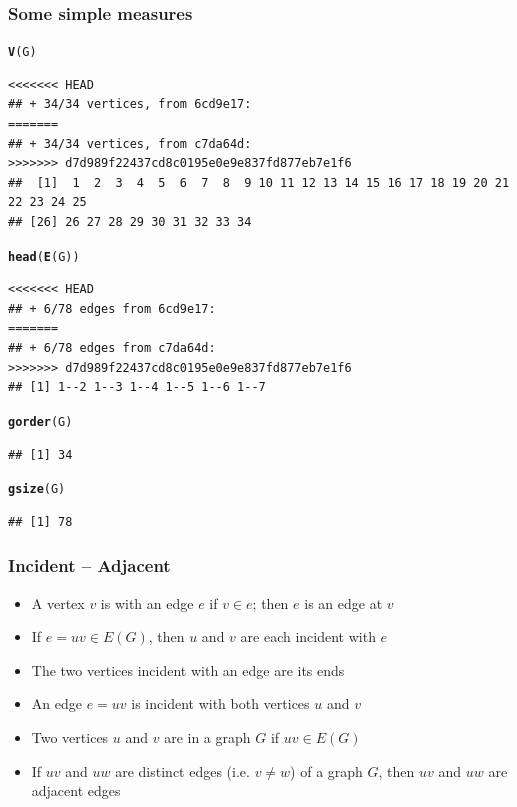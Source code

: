 \documentclass[aspectratio=169]{beamer}\usepackage[]{graphicx}\usepackage[]{xcolor}
\makeatletter
\newcommand{\hldef}[1]{\textcolor[rgb]{0.345,0.345,0.345}{#1}}%
\newcommand{\hlkwd}[1]{\textcolor[rgb]{0.737,0.353,0.396}{\textbf{#1}}}%
\newenvironment{kframe}{%
 \def\at@end@of@kframe{}%
 \ifinner\ifhmode%
  \def\at@end@of@kframe{\end{minipage}}%
  \begin{minipage}{\columnwidth}%
 \fi\fi%
 \def\FrameCommand##1{\hskip\@totalleftmargin \hskip-\fboxsep
 \colorbox{shadecolor}{##1}\hskip-\fboxsep
     \hskip-\linewidth \hskip-\@totalleftmargin \hskip\columnwidth}%
 \MakeFramed {\advance\hsize-\width
   \@totalleftmargin\z@ \linewidth\hsize
   \@setminipage}}%
 {\par\unskip\endMakeFramed%
 \at@end@of@kframe}
\newenvironment{knitrout}{}{} %
\makeatother
\begin{document}
\begin{frame}[fragile]\frametitle{Some simple measures}
\begin{knitrout}
\color{fgcolor}\begin{kframe}
\begin{alltt}
\hlkwd{V}\hldef{(G)}
\end{alltt}
\begin{verbatim}
<<<<<<< HEAD
## + 34/34 vertices, from 6cd9e17:
=======
## + 34/34 vertices, from c7da64d:
>>>>>>> d7d989f22437cd8c0195e0e9e837fd877eb7e1f6
##  [1]  1  2  3  4  5  6  7  8  9 10 11 12 13 14 15 16 17 18 19 20 21 22 23 24 25
## [26] 26 27 28 29 30 31 32 33 34
\end{verbatim}
\begin{alltt}
\hlkwd{head}\hldef{(}\hlkwd{E}\hldef{(G))}
\end{alltt}
\begin{verbatim}
<<<<<<< HEAD
## + 6/78 edges from 6cd9e17:
=======
## + 6/78 edges from c7da64d:
>>>>>>> d7d989f22437cd8c0195e0e9e837fd877eb7e1f6
## [1] 1--2 1--3 1--4 1--5 1--6 1--7
\end{verbatim}
\begin{alltt}
\hlkwd{gorder}\hldef{(G)}
\end{alltt}
\begin{verbatim}
## [1] 34
\end{verbatim}
\begin{alltt}
\hlkwd{gsize}\hldef{(G)}
\end{alltt}
\begin{verbatim}
## [1] 78
\end{verbatim}
\end{kframe}
\end{knitrout}
\end{frame}

\begin{frame}\frametitle{Incident -- Adjacent}
	\begin{definition}[Incident]
	\begin{itemize}
	\item A vertex $v$ is  with an edge $e$ if $v\in e$; then $e$ is an edge at $v$
	\item If $e=uv\in E(G)$, then $u$ and $v$ are each incident with $e$
	\item The two vertices incident with an edge are its ends
	\item An edge $e=uv$ is incident with both vertices $u$ and $v$
	\end{itemize}
	\end{definition}
	\vfill
	\begin{definition}[Adjacent]
	\begin{itemize}
	\item Two vertices $u$ and $v$ are  in a graph $G$ if $uv\in E(G)$
	\item If $uv$ and $uw$ are distinct edges (i.e. $v\not=w$) of a graph $G$, then $uv$ and $uw$ are adjacent edges
	\end{itemize}
	\end{definition}
\end{frame}
\end{document}
